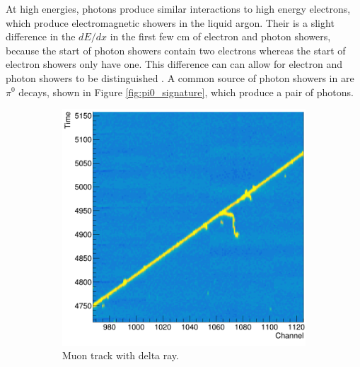 At high energies, photons produce similar interactions to high energy electrons,
which produce electromagnetic showers in the liquid argon. Their is a slight
difference in the $dE/dx$ in the first few cm of electron and photon showers, 
because the start of photon showers contain two electrons whereas the start of
electron showers only have one. This difference can can allow for electron and 
photon showers to be distinguished \cite{Acciarri:2016sli}. A common source of 
photon showers in \protodune{} are $\pi^0$ decays, shown in Figure 
\ref{fig:pi0_signature}, which produce a pair of photons.
\begin{figure}

	\centering

	\begin{subfigure}[b]{0.49\textwidth}
		\centering
		\includegraphics[width=\textwidth]{figures/muon_signature.png}
		\caption{Muon track with delta ray.}
		\label{fig:muon_signature}
	\end{subfigure}
	\hfill
	\begin{subfigure}[b]{0.49\textwidth}
		\centering

\end{subfigure}
\end{figure}
